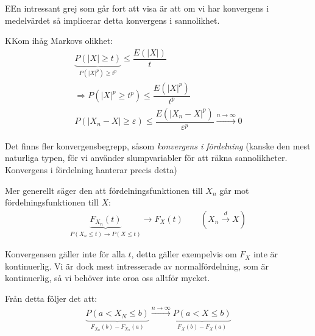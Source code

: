 \begin{theo}
  EEn intressant grej som går fort att visa är att om vi har konvergens i medelvärdet så implicerar detta konvergens i sannolikhet.
\end{theo}
\par\bigskip
\begin{prf}
  KKom ihåg Markovs olikhet:
  \begin{equation*}
    \begin{gathered}
      \underbrace{P(\left|X\right|\geq t)}_{\text{$P(\left|X\right|^p)\geq t^p$}}\leq \dfrac{E(\left|X\right|)}{t}\\
      \Rightarrow P(\left|X\right|^p\geq t^p)\leq \dfrac{E(\left|X\right|^p)}{t^p}\\
      P(\left|X_n-X\right|\geq\varepsilon)\leq \dfrac{E(\left|X_n-X\right|^p)}{\varepsilon^p}\stackrel{n\to\infty}{\rightarrow}0
    \end{gathered}
  \end{equation*}
\end{prf}
\par\bigskip
\noindent Det finns fler konvergensbegrepp, såsom \textit{konvergens i fördelning} (kanske den mest naturliga typen, för vi använder slumpvariabler för att räkna sannolikheter. Konvergens i fördelning hanterar precis detta)\par
\noindent Mer generellt säger den att fördelningsfunktionen till $X_n$ går mot fördelningsfunktionen till $X$:
\begin{equation*}
  \begin{gathered}
    \underbrace{F_{X_n}(t)}_{\text{$P(X_n\leq t)\to P(X\leq t)$}}\rightarrow F_X(t)\qquad (X_n\stackrel{d}{\rightarrow}X)
  \end{gathered}
\end{equation*}\par
\noindent Konvergensen gäller inte för alla $t$, detta gäller exempelvis om $F_X$ inte är kontinuerlig. Vi är dock mest intresserade av normalfördelning, som är kontinuerlig, så vi behöver inte oroa oss alltför mycket.\par
\noindent Från detta följer det att:
\begin{equation*}
  \begin{gathered}
    \underbrace{P(a< X_N\leq b)}_{\text{$F_{X_n}(b)-F_{X_n}(a)$}}\stackrel{n\to\infty}{\rightarrow}\underbrace{P(a< X\leq b)}_{\text{$F_X(b)-F_X(a)$}}
  \end{gathered}
\end{equation*}
\par\bigskip
